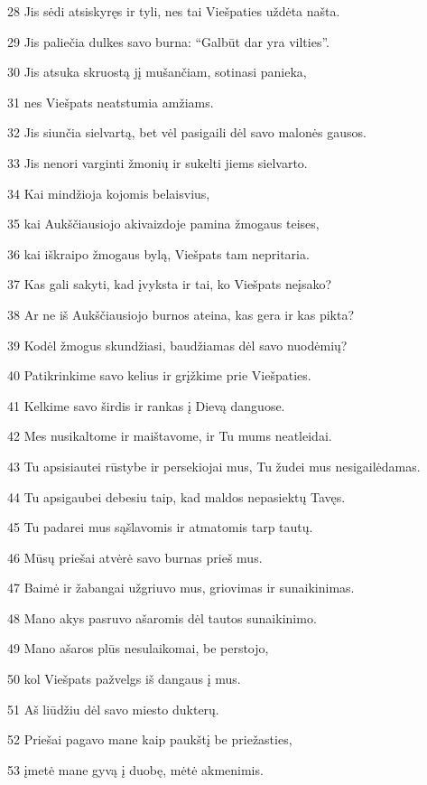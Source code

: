 \par 28 Jis sėdi atsiskyręs ir tyli, nes tai Viešpaties uždėta našta. 
\par 29 Jis paliečia dulkes savo burna: “Galbūt dar yra vilties”. 
\par 30 Jis atsuka skruostą jį mušančiam, sotinasi panieka, 
\par 31 nes Viešpats neatstumia amžiams. 
\par 32 Jis siunčia sielvartą, bet vėl pasigaili dėl savo malonės gausos. 
\par 33 Jis nenori varginti žmonių ir sukelti jiems sielvarto. 
\par 34 Kai mindžioja kojomis belaisvius, 
\par 35 kai Aukščiausiojo akivaizdoje pamina žmogaus teises, 
\par 36 kai iškraipo žmogaus bylą, Viešpats tam nepritaria. 
\par 37 Kas gali sakyti, kad įvyksta ir tai, ko Viešpats neįsako? 
\par 38 Ar ne iš Aukščiausiojo burnos ateina, kas gera ir kas pikta? 
\par 39 Kodėl žmogus skundžiasi, baudžiamas dėl savo nuodėmių? 
\par 40 Patikrinkime savo kelius ir grįžkime prie Viešpaties. 
\par 41 Kelkime savo širdis ir rankas į Dievą danguose. 
\par 42 Mes nusikaltome ir maištavome, ir Tu mums neatleidai. 
\par 43 Tu apsisiautei rūstybe ir persekiojai mus, Tu žudei mus nesigailėdamas. 
\par 44 Tu apsigaubei debesiu taip, kad maldos nepasiektų Tavęs. 
\par 45 Tu padarei mus sąšlavomis ir atmatomis tarp tautų. 
\par 46 Mūsų priešai atvėrė savo burnas prieš mus. 
\par 47 Baimė ir žabangai užgriuvo mus, griovimas ir sunaikinimas. 
\par 48 Mano akys pasruvo ašaromis dėl tautos sunaikinimo. 
\par 49 Mano ašaros plūs nesulaikomai, be perstojo, 
\par 50 kol Viešpats pažvelgs iš dangaus į mus. 
\par 51 Aš liūdžiu dėl savo miesto dukterų. 
\par 52 Priešai pagavo mane kaip paukštį be priežasties, 
\par 53 įmetė mane gyvą į duobę, mėtė akmenimis. 
